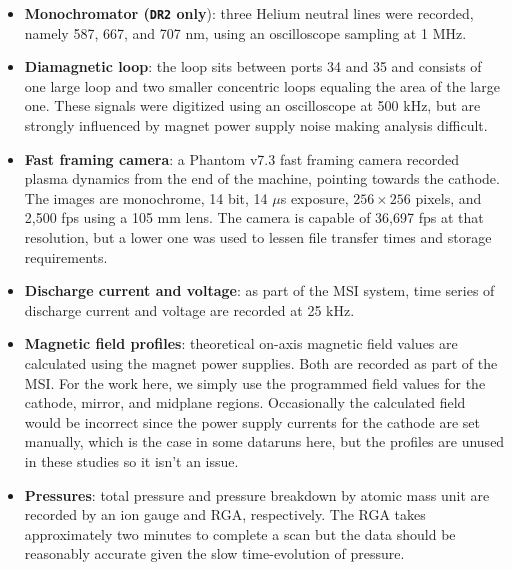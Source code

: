 \begin{itemize}
	\item \textbf{Monochromator (\texttt{DR2} only}): three Helium neutral lines were recorded, namely 587, 667, and 707 nm, using an oscilloscope sampling at 1 MHz.
	\item \textbf{Diamagnetic loop}: the loop sits between ports 34 and 35 and consists of one large loop and two smaller concentric loops equaling the area of the large one. These signals were digitized using an oscilloscope at 500 kHz, but are strongly influenced by magnet power supply noise making analysis difficult.
	\item \textbf{Fast framing camera}: a Phantom v7.3 fast framing camera recorded plasma dynamics from the end of the machine, pointing towards the cathode. The images are monochrome, 14 bit, 14 $\mu$s exposure, $256\times256$ pixels, and 2,500 fps using a 105 mm lens. The camera is capable of 36,697 fps at that resolution, but a lower one was used to lessen file transfer times and storage requirements.
	\item \textbf{Discharge current and voltage}: as part of the MSI system, time series of discharge current and voltage are recorded at 25 kHz.
	\item \textbf{Magnetic field profiles}: theoretical on-axis magnetic field values are calculated using the magnet power supplies. Both are recorded as part of the MSI. For the work here, we simply use the programmed field values for the cathode, mirror, and midplane regions. Occasionally the calculated field would be incorrect since the power supply currents for the cathode are set manually, which is the case in some dataruns here, but the profiles are unused in these studies so it isn't an issue.
	\item \textbf{Pressures}: total pressure and pressure breakdown by atomic mass unit are recorded by an ion gauge and RGA, respectively. The RGA takes approximately two minutes to complete a scan but the data should be reasonably accurate given the slow time-evolution of pressure.
\end{itemize}

